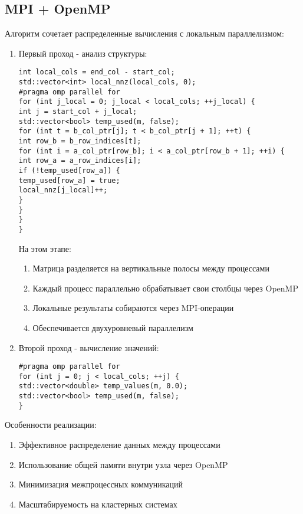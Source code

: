 \documentclass[12pt]{article}
\begin{document}
\subsection{MPI + OpenMP}
Алгоритм сочетает распределенные вычисления с локальным параллелизмом:
\begin{enumerate}
\item Первый проход - анализ структуры:
\begin{lstlisting}
int local_cols = end_col - start_col;
std::vector<int> local_nnz(local_cols, 0);
#pragma omp parallel for
for (int j_local = 0; j_local < local_cols; ++j_local) {
int j = start_col + j_local;
std::vector<bool> temp_used(m, false);
for (int t = b_col_ptr[j]; t < b_col_ptr[j + 1]; ++t) {
int row_b = b_row_indices[t];
for (int i = a_col_ptr[row_b]; i < a_col_ptr[row_b + 1]; ++i) {
int row_a = a_row_indices[i];
if (!temp_used[row_a]) {
temp_used[row_a] = true;
local_nnz[j_local]++;
}
}
}
}
\end{lstlisting}
На этом этапе:
\begin{enumerate}
\item Матрица разделяется на вертикальные полосы между процессами
\item Каждый процесс параллельно обрабатывает свои столбцы через OpenMP
\item Локальные результаты собираются через MPI-операции
\item Обеспечивается двухуровневый параллелизм
\end{enumerate}
\item Второй проход - вычисление значений:
\begin{lstlisting}
#pragma omp parallel for
for (int j = 0; j < local_cols; ++j) {
std::vector<double> temp_values(m, 0.0);
std::vector<bool> temp_used(m, false);
}
\end{lstlisting}
\end{enumerate}
Особенности реализации:
\begin{enumerate}
\item Эффективное распределение данных между процессами
\item Использование общей памяти внутри узла через OpenMP
\item Минимизация межпроцессных коммуникаций
\item Масштабируемость на кластерных системах
\end{enumerate}
\end{document}
